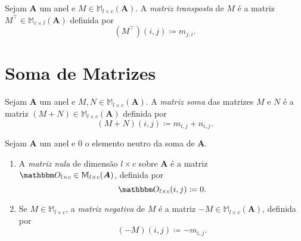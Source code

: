 \begin{defi}
	Sejam $\bm A$ um anel e $M \in \mathbb M_{l \times c}(\bm A)$. A \emph{matriz transposta} de $M$ é a matriz $M^\intercal \in \mathbb M_{c \times l}(\bm A)$ definida por
	\begin{equation*}
	(M^\intercal)(i,j) \coloneqq m_{j,i}.
	\end{equation*}
\end{defi}

\section{Soma de Matrizes}

\begin{defi}
	Sejam $\bm A$ um anel e $M,N \in \mathbb M_{l \times c}(\bm A)$. A \emph{matriz soma} das matrizes $M$ e $N$ é a matriz $(M+N) \in \mathbb M_{l \times c}(\bm A)$ definida por
	\begin{equation*}
	(M+N)(i,j) \coloneqq m_{i,j}+n_{i,j}.
	\end{equation*}
\end{defi}

\begin{defi}
	Sejam $\bm A$ um anel e $0$ o elemento neutro da soma de $\bm A$.
	\begin{enumerate}
	\item A \emph{matriz nula} de dimensão $l \times c$ sobre $\bm A$ é a matriz $\zero_{l \times c} \in \mathbb M_{l \times c}(\bm A)$, definida por
		\begin{equation*}
		\zero_{l \times c}(i,j) \coloneqq 0.
		\end{equation*}
	\item Se $M \in \mathbb M_{l \times c}$, a \emph{matriz negativa} de $M$ é a matriz $-M \in \mathbb M_{l \times c}(\bm A)$, definida por
		\begin{equation*}
		(-M)(i,j) \coloneqq -m_{i,j}.
		\end{equation*}
	\end{enumerate}
\end{defi}


